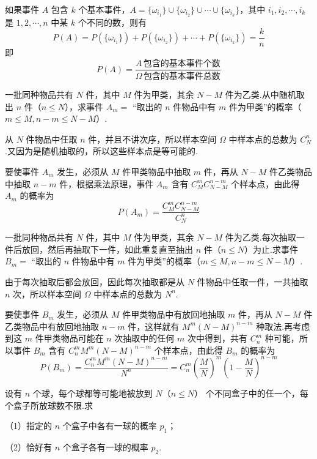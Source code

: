 如果事件 $A$ 包含 $k$ 个基本事件，$A=\{\omega_{i_1}\} \cup \{\omega_{i_2}\} \cup \cdots \cup \{\omega_{i_k}\}$，其中 $i_1,i_2,\cdots,i_k$ 是 $1,2,\cdots,n$ 中某 $k$ 个不同的数，则有
$$
P(A) = P(\{\omega_{i_1}\}) + P(\{\omega_{i_2}\}) + \cdots + P(\{\omega_{i_k}\}) = \dfrac{k}{n}
$$
即
$$
P(A)=\dfrac{A\,\text{包含的基本事件个数}}{\varOmega\,\text{包含的基本事件总数}}
$$

\begin{example}[][不放回抽样]
    \indent 一批同种物品共有 $N$ 件，其中 $M$ 件为甲类，其余 $N-M$ 件为乙类.从中随机取出 $n$ 件（$n \leqslant N$），求事件 $A_m=$ “取出的 $n$ 件物品中有 $m$ 件为甲类”的概率（$m \leqslant M, n-m \leqslant N-M$）.
\end{example}

\begin{solution}
    从 $N$ 件物品中任取 $n$ 件，并且不讲次序，所以样本空间 $\varOmega$ 中样本点的总数为 $C_N^n$.又因为是随机抽取的，所以这些样本点是等可能的.

    要使事件 $A_m$ 发生，必须从 $M$ 件甲类物品中抽取 $m$ 件，再从 $N-M$ 件乙类物品中抽取 $n-m$ 件，根据乘法原理，事件 $A_m$ 含有 $C_M^m C_{N-M}^{n-m}$ 个样本点，由此得 $A_m$ 的概率为
    $$
    P(A_m) = \dfrac{C_M^m C_{N-M}^{n-m}}{C_N^n}
    $$
\end{solution}

\begin{example}[][放回抽样]
    \indent 一批同种物品共有 $N$ 件，其中 $M$ 件为甲类，其余 $N-M$ 件为乙类.每次抽取一件后放回，然后再抽取下一件，如此重复直至抽出 $n$ 件（$n \leqslant N$）为止.求事件 $B_m=$ “取出的 $n$ 件物品中有 $m$ 件为甲类”的概率（$m \leqslant M, n-m \leqslant N-M$）.
\end{example}

\begin{solution}
    由于每次抽取后都会放回，因此每次抽取都是从 $N$ 件物品中任取一件，一共抽取 $n$ 次，所以样本空间 $\varOmega$ 中样本点的总数为 $N^n$.

    要使事件 $B_m$ 发生，必须从 $M$ 件甲类物品中有放回地抽取 $m$ 件，再从 $N-M$ 件乙类物品中有放回地抽取 $n-m$ 件，这样就有 $M^m (N-M)^{n-m}$ 种取法.再考虑到这 $m$ 件甲类物品可能在 $n$ 次抽取中的任何 $m$ 次中得到，共有 $C_n^m$ 种可能，所以事件 $B_m$ 含有 $C_n^m M^m (N-M)^{n-m}$ 个样本点，由此得 $B_m$ 的概率为
    $$
    P(B_m) = \dfrac{C_n^m M^m (N-M)^{n-m}}{N^n} = C_n^m \left( \dfrac{M}{N} \right)^m \left( 1 - \dfrac{M}{N} \right)^{n-m}
    $$
\end{solution}

\begin{example}
    \indent 设有 $n$ 个球，每个球都等可能地被放到 $N$（$n \leqslant N$） 个不同盒子中的任一个，每个盒子所放球数不限.求

    （1）指定的 $n$ 个盒子中各有一球的概率 $p_1$；

    （2）恰好有 $n$ 个盒子各有一球的概率 $p_2$.
\end{example}

